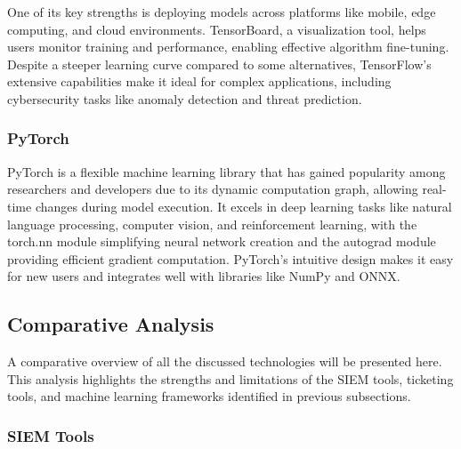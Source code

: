 One of its key strengths is deploying models across platforms like mobile, edge computing, and cloud environments. 
TensorBoard, a visualization tool, helps users monitor training and performance, enabling effective algorithm fine-tuning. 
Despite a steeper learning curve compared to some alternatives, TensorFlow's extensive capabilities make it ideal for complex applications, including cybersecurity tasks like anomaly detection and threat prediction.

\subsubsection{PyTorch}
PyTorch is a flexible machine learning library that has gained popularity among researchers and developers due to its dynamic computation graph, allowing real-time changes during model execution. 
It excels in deep learning tasks like natural language processing, computer vision, and reinforcement learning, with the torch.nn module simplifying neural network creation and the autograd module providing efficient gradient computation. 
PyTorch's intuitive design makes it easy for new users and integrates well with libraries like NumPy and ONNX. 

\subsection{Comparative Analysis}

A comparative overview of all the discussed technologies will be presented here. This analysis highlights the strengths and limitations of the SIEM tools, ticketing tools, and machine learning frameworks identified in previous subsections.

\subsubsection{SIEM Tools}

